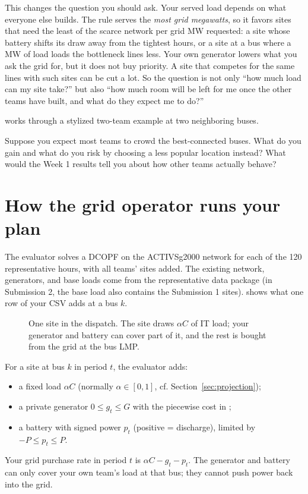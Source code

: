 \documentclass[10pt]{article}
\begin{document}
This changes the question you should ask. Your served load depends on what
everyone else builds. The rule serves the \emph{most grid megawatts}, so it
favors sites that need the least of the scarce network per grid MW requested: a
site whose battery shifts its draw away from the tightest hours, or a site at a
bus where a MW of load loads the bottleneck lines less. Your own generator
lowers what you ask the grid for, but it does not buy priority. A site that competes for the same
lines with such sites can be cut a lot. So the question is not only ``how much
load can my site take?'' but also ``how much room will be left for me once the
other teams have built, and what do they expect me to do?''

 works through a stylized two-team example at two
neighboring buses.

\begin{exercisebox}
Suppose you expect most teams to crowd the best-connected buses. What do you
gain and what do you risk by choosing a less popular location instead? What
would the Week 1 results tell you about how other teams actually behave?
\end{exercisebox}

\section{How the grid operator runs your plan}\label{sec:model}

The evaluator solves a DCOPF on the ACTIVSg2000 network for each of the 120
representative hours, with all teams' sites added. The existing network,
generators, and base loads come from the representative data package (in
Submission 2, the base load also contains the Submission 1 sites). 
shows what one row of your CSV adds at a bus $k$.

\begin{figure}[htbp]
  \centering
  
  \caption{One site in the dispatch. The site draws $\alpha C$ of IT load; your
  generator and battery can cover part of it, and the rest is bought from the
  grid at the bus LMP.}
  \label{fig:site}
\end{figure}

For a site at bus $k$ in period $t$, the evaluator adds:
\begin{itemize}[leftmargin=*]
  \item a fixed load $\alpha C$ (normally $\alpha \in [0,1]$, cf. Section~\ref{sec:projection});
  \item a private generator $0 \le g_t \le G$ with the piecewise cost in ;
  \item a battery with signed power $p_t$ (positive = discharge), limited by
    $-P \le p_t \le P$.
\end{itemize}
Your grid purchase rate in period $t$ is $\alpha C - g_t - p_t$. The generator and
battery can only cover your own team's load at that bus; they cannot push power
back into the grid.
\end{document}

